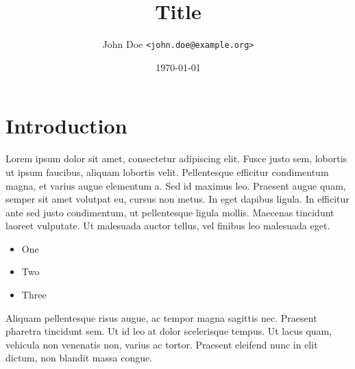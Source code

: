 \documentclass[10pt,a4paper,twoside,twocolumn]{article}
\title{Title}
\author{John Doe \texttt{<john.doe@example.org>}}
\date{\today}
\begin{document}
\maketitle

\begin{abstract}


\end{abstract}

\section{Introduction}

Lorem ipsum dolor sit amet, consectetur adipiscing elit. Fusce justo sem, lobortis ut ipsum faucibus, aliquam lobortis velit. Pellentesque efficitur condimentum magna, et varius augue elementum a. Sed id maximus leo. Praesent augue quam, semper sit amet volutpat eu, cursus non metus. In eget dapibus ligula. In efficitur ante sed justo condimentum, ut pellentesque ligula mollis. Maecenas tincidunt laoreet vulputate. Ut malesuada auctor tellus, vel finibus leo malesuada eget.

\begin{itemize}
  \item One
  \item Two
  \item Three
\end{itemize}

Aliquam pellentesque risus augue, ac tempor magna sagittis nec. Praesent pharetra tincidunt sem. Ut id leo at dolor scelerisque tempus. Ut lacus quam, vehicula non venenatis non, varius ac tortor. Praesent eleifend nunc in elit dictum, non blandit massa congue.
\end{document}
